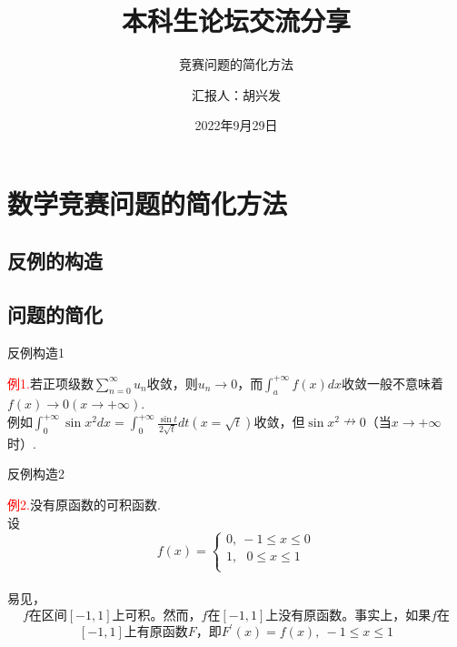\documentclass{beamer}
\author{汇报人：胡兴发} %
\title{本科生论坛交流分享} %
\subtitle{竞赛问题的简化方法} %
\institute{数理科学学院}
\date{2022年9月29日} %
\institute[IaHS]{指导老师：张本龚}
\begin{document}
\kaishu
\begin{frame}
    \titlepage
\end{frame}






\section{数学竞赛问题的简化方法}
\subsection{反例的构造}
\subsection{问题的简化}


\begin{frame}{反例构造1}
\begin{spacing}{2.0}
\textcolor{red}{例1.}若正项级数$\sum\limits_{n=0}^{\infty}u_n$收敛，则$u_n\to 0$，而$\int_{a}^{+\infty}f(x)dx $收敛一般不意味着$f(x)\to 0(x\to  +\infty)$.\\ \vspace{.5cm}例如$\int_{0}^{+\infty}\sin x^2dx =  \int_{0}^{+\infty} \frac{\sin t}{2\sqrt t}dt(x=\sqrt t)$收敛，但$\sin x^2\nrightarrow 0$（当$x\to +\infty$时）.
	\end{spacing}
\end{frame}

\begin{frame}{反例构造2}
	\begin{spacing}{2.0}
		\textcolor{red}{例2.}没有原函数的可积函数.\\设$$
		f\left( x \right) =\left\{ \begin{array}{l}
			0,\ -1\le x\le 0\\
			1,\ \ \ 0\le x\le 1\\
		\end{array} \right. 
		$$\\易见，$$f\text{在区间}\left[ -1,1 \right] \text{上可积。然而，}f\text{在}\left[ -1,1 \right] \text{上没有原函数。事实上，如果}f\text{在}$$
		$$
		\left[ -1,1 \right] \text{上有原函数}F\text{，即}F^'\left( x \right) =f\left( x \right) ,\ -1\le x\le 1
		$$
		
		
	\end{spacing}
\end{frame}
\end{document}

